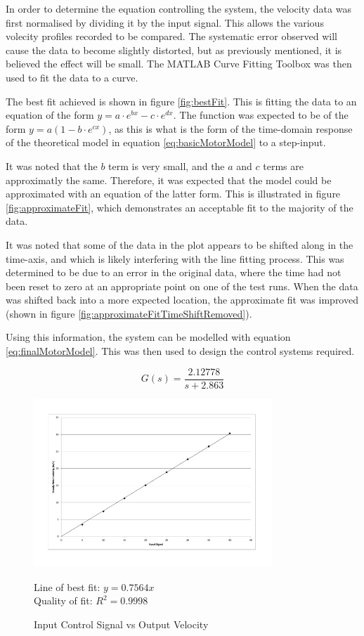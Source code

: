 \documentclass[10pt]{article} \usepackage[a4paper]{geometry}
\begin{document}
In order to determine the equation controlling the system, the velocity data was
first normalised by dividing it by the input signal.  This allows the various
volecity profiles recorded to be compared.  The systematic error observed will
cause the data to become slightly distorted, but as previously mentioned, it is
believed the effect will be small.  The MATLAB Curve Fitting Toolbox was then
used to fit the data to a curve.

The best fit achieved is shown in figure \ref{fig:bestFit}.  This is fitting the
data to an equation of the form $y = a \cdot e^{bx} - c \cdot e^{dx} $.  The
function was expected to be of the form $y = a(1-b \cdot e^{cx})$, as this is
what is the form of the time-domain response of the theoretical model in
equation \ref{eq:basicMotorModel} to a step-input.

It was noted that the $b$ term is very small, and the $a$ and $c$ terms are
approximatly the same.  Therefore, it was expected that the model could be
approximated with an equation of the latter form.  This is illustrated in figure
\ref{fig:approximateFit}, which demonstrates an acceptable fit to the majority
of the data.

It was noted that some of the data in the plot appears to be shifted along in
the time-axis, and which is likely interfering with the line fitting process.
This was determined to be due to an error in the original data, where the time
had not been reset to zero at an appropriate point on one of the test runs.
When the data was shifted back into a more expected location, the approximate
fit was improved (shown in figure \ref{fig:approximateFitTimeShiftRemoved}).

Using this information, the system can be modelled with equation
\ref{eq:finalMotorModel}.  This was then used to design the control systems
required.

\begin{equation}
 \label{eq:finalMotorModel}
 G\left(s\right) = \frac{2.12778}{s+2.863}
\end{equation}

\begin{figure}
 \centering
 \includegraphics[width=0.8\textwidth]{Images/input-signal-vs-output-speed}
 \caption{Input Control Signal vs Output Velocity}
 \label{fig:inputOutputVelocityGraph}

 Line of best fit: $y=0.7564x$ \\
 Quality of fit: $R^2 = 0.9998$
\end{figure}
\end{document}
